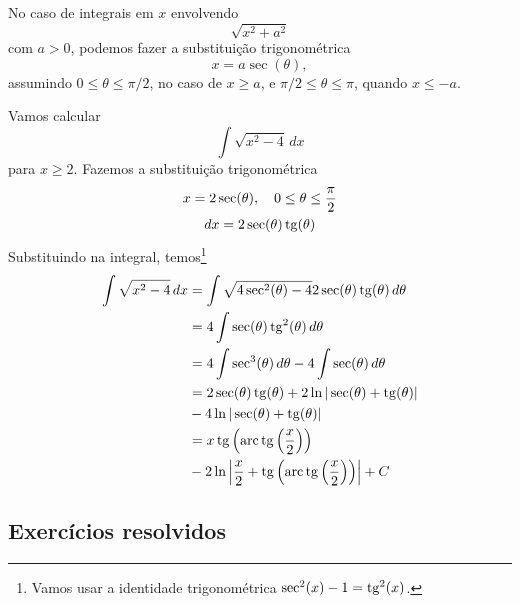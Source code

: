 No caso de integrais em $x$ envolvendo
\begin{equation}
  \sqrt{x^2+a^2}
\end{equation}
com $a>0$, podemos fazer a substituição trigonométrica
\begin{equation}
  x = a\sec(\theta),
\end{equation}
assumindo $0\leq\theta\leq\pi/2$, no caso de $x\geq a$, e $\pi/2\leq\theta\leq\pi$, quando $x\leq -a$.

\begin{ex}
  Vamos calcular
  \begin{equation}
    \int\sqrt{x^2-4}\,dx
  \end{equation}
  para $x\geq 2$. Fazemos a substituição trigonométrica
  \begin{gather}
    x = 2\sec(\theta),\quad 0\leq\theta\leq\frac{\pi}{2}\\
    dx = 2\sec(\theta)\operatorname{tg}(\theta)
  \end{gather}
  Substituindo na integral, temos\footnote{Vamos usar a identidade trigonométrica $\sec^2(x)-1=\operatorname{tg}^2(x)$.}
  \begin{align}
    \int\sqrt{x^2-4}\,dx &= \int\sqrt{4\sec^2(\theta)-4}2\sec(\theta)\operatorname{tg}(\theta)\,d\theta\\
                         &= 4\int\sec(\theta)\operatorname{tg}^2(\theta)\,d\theta\\
                         &= 4\int\sec^3(\theta)\,d\theta - 4\int\sec(\theta)\,d\theta\\
                         &= 2\sec(\theta)\operatorname{tg}(\theta) + 2\ln|\sec(\theta)+\operatorname{tg}(\theta)| \\
                         &- 4\ln|\sec(\theta)+\operatorname{tg}(\theta)|\\
                         &= x\operatorname{tg}\left(\operatorname{arc}\operatorname{tg}\left(\frac{x}{2}\right)\right) \\
                         &- 2\ln\left|\frac{x}{2}+\operatorname{tg}\left(\operatorname{arc}\operatorname{tg}\left(\frac{x}{2}\right)\right)\right| + C
  \end{align}
\end{ex}

\subsection*{Exercícios resolvidos}

